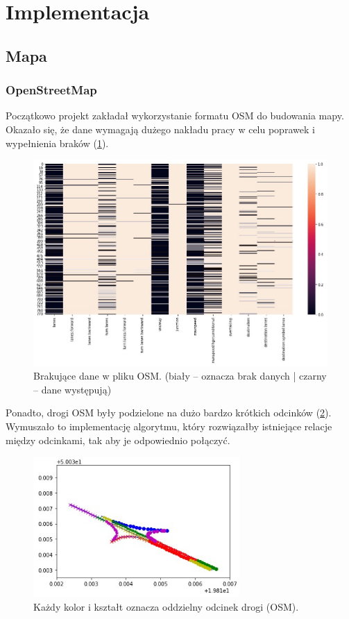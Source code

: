 \documentclass[a4paper,12pt]{article}
\begin{document}
    \section{Implementacja}
    
    \subsection{Mapa}
    \subsubsection{OpenStreetMap}
    Początkowo projekt zakładał wykorzystanie formatu OSM do budowania mapy. Okazało się, że dane wymagają dużego nakładu pracy w celu poprawek i wypełnienia braków (\ref{osm-na}).
    
    \begin{figure}[h]
    	\centering
    	\includegraphics[width=\textwidth]{img/whiteisna.jpg}
    	\caption{Brakujące dane w pliku OSM. (biały -- oznacza brak danych | czarny -- dane występują)}
    	\label{osm-na}
    \end{figure}
    
    Ponadto, drogi OSM były podzielone na dużo bardzo krótkich odcinków (\ref{osm-parts}). Wymuszało to implementację algorytmu, który rozwiązałby istniejące relacje między odcinkami, tak aby je odpowiednio połączyć.
    
    \begin{figure}[h]
    	\centering
    	\includegraphics[width=0.7\textwidth]{img/osmparts.jpg}
    	\caption{Każdy kolor i kształt oznacza oddzielny odcinek drogi (OSM).}
    	\label{osm-parts}
    \end{figure}
    
\end{document}
